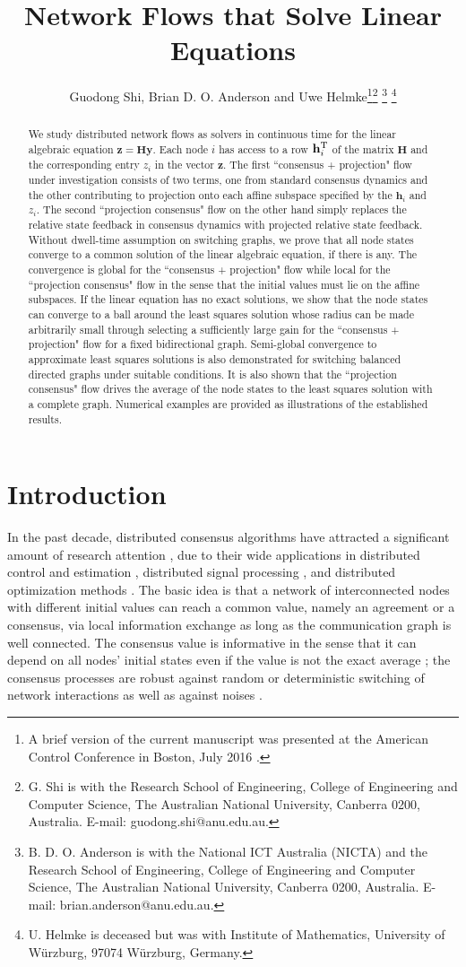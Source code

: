 \documentclass[a4paper, 11pt]{article}
\title{\bf Network  Flows that Solve Linear   Equations}
\author{Guodong Shi, Brian D. O. Anderson and Uwe Helmke\thanks{A brief version of the current manuscript  was presented at  the American Control Conference in Boston, July 2016 \cite{acc2016}.
}\thanks{G. Shi is with the Research School of Engineering, College of Engineering and Computer Science, The Australian National University, Canberra 0200, Australia. E-mail: guodong.shi@anu.edu.au.}
\thanks{B. D. O. Anderson is with the National ICT Australia (NICTA) and the Research School of Engineering, College of Engineering and Computer Science, The Australian National University, Canberra 0200, Australia. E-mail: brian.anderson@anu.edu.au.}
\thanks{U. Helmke is deceased but was  with  Institute of Mathematics, University of W\"{u}rzburg, 97074 W\"{u}rzburg, Germany. }}
\date{}
\def\T{^{\rm\tiny T}}
\begin{document}
\maketitle


\begin{abstract}
We study  distributed network flows as  solvers  in continuous time for the linear algebraic equation $\mathbf{z}=\mathbf{H}\mathbf{y}$. Each node $i$ has access to a row $\mathbf{h}_i\T$ of the matrix $\mathbf{H}$ and  the corresponding entry $z_i$ in the vector $\mathbf{z}$. The first ``consensus + projection" flow under investigation  consists of two terms, one from standard consensus dynamics and the other contributing  to projection onto each affine subspace specified by the $\mathbf{h}_i$ and $z_i$. The second ``projection consensus" flow on the other hand simply replaces the relative state feedback in consensus dynamics with projected relative state feedback.
Without  dwell-time assumption on switching graphs, we prove that all node states converge to a common solution of the linear algebraic equation, if there is any. The convergence is global for the ``consensus + projection" flow while local for the ``projection consensus" flow in the sense that the initial values must lie on the affine subspaces.  If the linear equation has no exact solutions, we show that the node states can converge to a ball around the least squares solution whose radius can be made arbitrarily small through selecting a sufficiently large gain for the ``consensus + projection" flow for a fixed bidirectional graph. Semi-global convergence to approximate least squares solutions is also demonstrated  for switching balanced directed graphs under suitable conditions. It is also shown that the ``projection consensus" flow drives the average of the node states to the least squares solution with a complete graph. Numerical examples are provided as illustrations of the established results.
\end{abstract}
\section{Introduction}

In the past decade, distributed consensus algorithms have attracted a significant amount of research attention \cite{jad03, xiao04,  saber04,  ren05}, due to their wide applications in distributed control and estimation \cite{martinez07,kar12}, distributed signal processing \cite{Rabbat2010}, and distributed optimization methods \cite{rabbat2004,nedic09}. The basic idea is that a network of interconnected nodes with different initial values can reach a common value, namely an  agreement or a consensus, via local information exchange as long as the communication graph is well connected. The consensus value is informative in the sense that it can depend on all nodes' initial states  even if the value is not the exact average \cite{jackson}; the consensus processes are robust against random or deterministic switching of network interactions as well as against noises \cite{moreau05, lin07, jad08, shisiam}.
\end{document}
